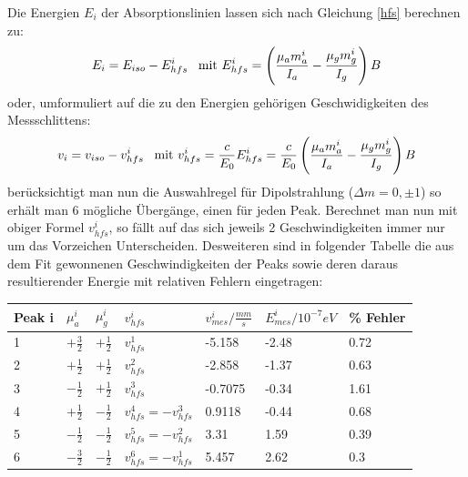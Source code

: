 \documentclass[12pt]{article}
\begin{document}
Die Energien $E_i$ der Absorptionslinien lassen sich nach Gleichung \ref{hfs} berechnen zu:
\begin{align*}
 E_i = E_{iso} - E_{hfs}^i \hspace{5pt} \textnormal{    mit } E_{hfs}^i = \left( \frac{\mu_a m_a^i}{I_a} - \frac{\mu_g m_g^i}{I_g} \right) B
\end{align*}
oder, umformuliert auf die zu den Energien gehörigen Geschwidigkeiten des Messschlittens:
\begin{align*}
 v_i = v_{iso} - v_{hfs}^i \hspace{5pt} \textnormal{    mit } v_{hfs}^i = \frac{c}{E_0} E_{hfs}^i = \frac{c}{E_0} \left( \frac{\mu_a m_a^i}{I_a} - \frac{\mu_g m_g^i}{I_g} \right) B
\end{align*}
\label{geschw}
berücksichtigt man nun die Auswahlregel für Dipolstrahlung ($\Delta m = 0, \pm 1$) so erhält man 6 mögliche Übergänge, einen für jeden Peak. Berechnet man 
nun mit obiger Formel $v_{hfs}^i$, so fällt auf das sich jeweils 2 Geschwindigkeiten immer nur um das Vorzeichen Unterscheiden.
Desweiteren sind in folgender Tabelle die aus dem Fit gewonnenen Geschwindigkeiten der Peaks sowie deren daraus resultierender Energie mit relativen Fehlern
eingetragen:
\begin{center}
\begin{tabular}{|l|l|l|l|l|l|l|}
\hline
Peak i & $\mu_a^i$ & $\mu_g^i$ & $v_{hfs}^i$ & $v_{mes}^i/\frac{mm}{s}$ & $E_{mes}^i/10^{-7} eV$ & \% Fehler\\
\hline
1 & $+\frac{3}{2}$ & $+\frac{1}{2}$ & $v_{hfs}^1$ & -5.158 & -2.48 & 0.72\\
2 & $+\frac{1}{2}$ & $+\frac{1}{2}$ & $v_{hfs}^2$ & -2.858 & -1.37 & 0.63\\
3 & $-\frac{1}{2}$ & $+\frac{1}{2}$ & $v_{hfs}^3$ & -0.7075 & -0.34 & 1.61\\
4 & $+\frac{1}{2}$ & $-\frac{1}{2}$ & $v_{hfs}^4 = -v_{hfs}^3$ & 0.9118 & -0.44 & 0.68\\
5 & $-\frac{1}{2}$ & $-\frac{1}{2}$ & $v_{hfs}^5 = -v_{hfs}^2$ & 3.31 & 1.59 & 0.39\\
6 & $-\frac{3}{2}$ & $-\frac{1}{2}$ & $v_{hfs}^6 = -v_{hfs}^1$ & 5.457 & 2.62 & 0.3\\
\hline
\end{tabular}
\label{eisen_tab1}
\end{center}
\end{document}

